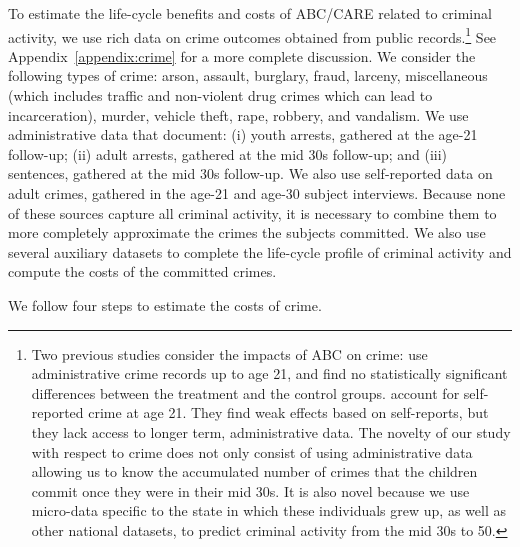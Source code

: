 To estimate the life-cycle benefits and costs of ABC/CARE related to criminal activity, we use rich data on crime outcomes obtained from public records.\footnote{Two previous studies consider the impacts of ABC on crime: \citet{Clarke_Campbell_1998_ABC_Comparison_ECRQ} use administrative crime records up to age 21, and find no statistically significant differences between the treatment and the control groups. \cite{Barnett_Masse_2002_benefitcost,Barnett_Masse_2007_EER} account for self-reported crime at age 21. They find weak effects based on self-reports, but they lack access to longer term, administrative data. The novelty of our study with respect to crime does not only consist of using administrative data allowing us to know the accumulated number of crimes that the children commit once they were in their mid 30s. It is also novel because we use micro-data specific to the state in which these individuals grew up, as well as other national datasets, to predict criminal activity from the mid 30s to 50.} See Appendix~\ref{appendix:crime} for a more complete discussion. We consider the following types of crime: arson, assault, burglary, fraud, larceny, miscellaneous (which includes traffic and non-violent drug crimes which can lead to incarceration), murder, vehicle theft, rape, robbery, and vandalism. We use administrative data that document: (i) youth arrests, gathered at the age-21 follow-up; (ii) adult arrests, gathered at the mid 30s follow-up; and (iii) sentences, gathered at the mid 30s follow-up. We also use self-reported data on adult crimes, gathered in the age-21 and age-30 subject interviews. Because none of these sources capture all criminal activity, it is necessary to combine them to more completely approximate the crimes the subjects committed. We also use several auxiliary datasets to complete the life-cycle profile of criminal activity and compute the costs of the committed crimes.

We follow four steps to estimate the costs of crime.

